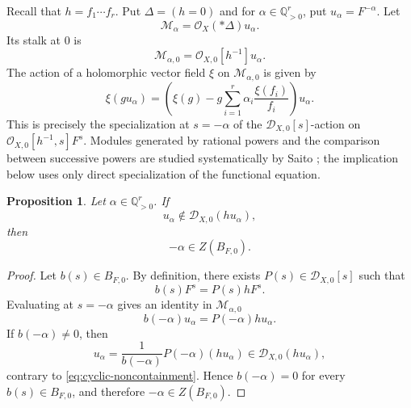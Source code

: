 \documentclass[12pt]{amsart}
\numberwithin{equation}{section}
\theoremstyle{plain}
\newtheorem{proposition}[theorem]{Proposition}
\theoremstyle{definition}
\theoremstyle{remark}
\theoremstyle{definition}
\newcommand{\Q}{\mathbb Q}
\newcommand{\D}{\mathscr D}
\begin{document}
Recall that $h=f_1\cdots f_r$. Put $\Delta=(h=0)$ and for $\alpha\in\Q_{>0}^r$, put $u_\alpha=F^{-\alpha}$. Let  
\begin{equation*}
\mathcal M_\alpha=\mathcal O_X(*\Delta)u_\alpha.
\end{equation*}
Its stalk at $0$ is
\begin{equation*}
\mathcal M_{\alpha,0}=\mathcal O_{X,0}[h^{-1}]u_\alpha.
\end{equation*}
The action of a holomorphic vector field $\xi$ on $\mathcal M_{\alpha,0}$ is given by
\begin{equation*}
\xi(gu_\alpha)=\left(\xi(g)-g\sum_{i=1}^r\alpha_i\frac{\xi(f_i)}{f_i}\right)u_\alpha.
\end{equation*}
This is precisely the specialization at $s=-\alpha$ of the $\D_{X,0}[s]$-action on $\mathcal O_{X,0}[h^{-1},s]F^s$. Modules generated by rational powers and the comparison between successive powers are studied systematically by Saito \cite{Saito2021RationalPowers}; the implication below uses only direct specialization of the functional equation.


\begin{proposition}\label{prop:affine-point-lifting}
Let $\alpha\in\Q_{>0}^r$. If
\begin{equation}\label{eq:cyclic-noncontainment}
 u_\alpha\notin\D_{X,0}(hu_\alpha),
\end{equation}
then
\begin{equation}\label{eq:point-in-bernstein-zero-set}
 -\alpha\in Z(B_{F,0}).
\end{equation}
\end{proposition}


\begin{proof}
Let $b(s)\in B_{F,0}$. By definition, there exists $P(s)\in\D_{X,0}[s]$ such that
\begin{equation*}
b(s)F^s=P(s)hF^s.
\end{equation*}
Evaluating at $s=-\alpha$ gives an identity in $\mathcal M_{\alpha,0}$
\begin{equation*}
b(-\alpha)u_\alpha=P(-\alpha)hu_\alpha.
\end{equation*}
If $b(-\alpha)\neq0$, then
\begin{equation*}
u_\alpha=\frac{1}{b(-\alpha)}P(-\alpha)(hu_\alpha) \in \D_{X,0}(hu_\alpha),
\end{equation*}
contrary to \eqref{eq:cyclic-noncontainment}. Hence $b(-\alpha)=0$ for every $b(s)\in B_{F,0}$, and therefore $-\alpha\in Z(B_{F,0})$.
\end{proof}
\end{document}
